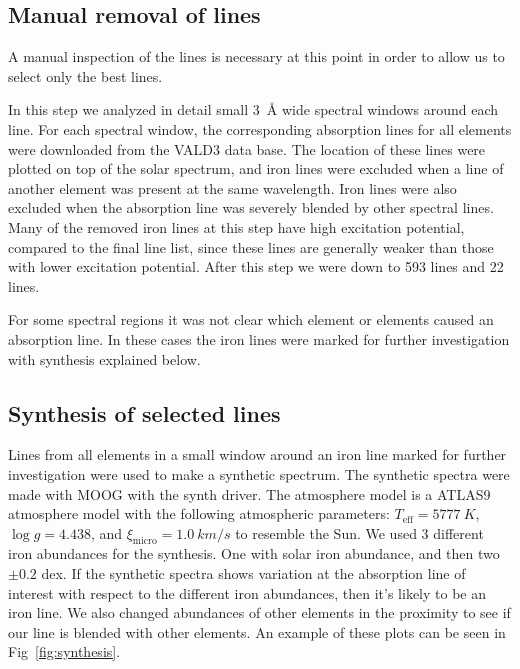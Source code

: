 \documentclass{aa}
\begin{document}
\subsection{Manual removal of lines}
\label{sub:manual_removal_of_lines}

A manual inspection of the lines is necessary at this
point in order to allow us to select only the best lines.

In this step we analyzed in detail small \SI{3}{\angstrom} wide spectral
windows around each line. For each spectral window, the corresponding
absorption lines for all elements were downloaded from the VALD3 data
base. The location of these lines were plotted on top of the solar
spectrum, and iron lines were excluded when a line of another element
was present at the same wavelength. Iron lines were also excluded when
the absorption line was severely blended by other spectral lines. Many
of the removed iron lines at this step have high excitation potential,
compared to the final line list, since these lines are generally weaker
than those with lower excitation potential. After this step
we were down to 593  lines and 22  lines.

For some spectral regions it was not clear which element or elements
caused an absorption line. In these cases the iron lines were marked for
further investigation with synthesis explained below.


\subsection{Synthesis of selected lines}
\label{sub:synthesis_of_selected_lines}

Lines from all elements in a small window around an iron line marked
for further investigation were used to make a synthetic spectrum.
The synthetic spectra were made with MOOG with the synth driver. The
atmosphere model is a ATLAS9 atmosphere model \citep{Kurucz1993} with
the following atmospheric parameters: $T_\mathrm{eff}=\SI{5777}{K}$,
$\log g = 4.438$, and $\xi_\mathrm{micro} = \SI{1.0}{km/s}$ to resemble
the Sun. We used 3 different iron abundances for the synthesis. One
with solar iron abundance, and then two $\pm0.2$ dex. If the synthetic
spectra shows variation at the absorption line of interest with respect
to the different iron abundances, then it's likely to be an iron line.
We also changed abundances of other elements in the proximity to see if
our line is blended with other elements. An example of these plots can
be seen in Fig~\ref{fig:synthesis}.
\end{document}
